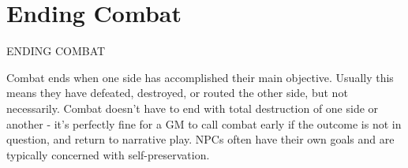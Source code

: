 \section{Ending Combat}

                                           ENDING COMBAT


Combat ends when one side has accomplished their main objective. Usually this means they
have defeated, destroyed, or routed the other side, but not necessarily. Combat doesn’t have to
end with total destruction of one side or another - it’s perfectly fine for a GM to call combat early
if the outcome is not in question, and return to narrative play. NPCs often have their own goals
and are typically concerned with self-preservation.
